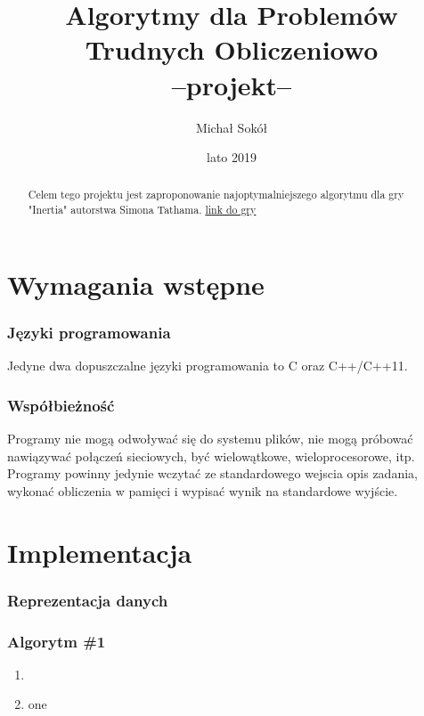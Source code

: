 \documentclass[12pt, letterpaper, twoside]{article}
\title{
	Algorytmy dla Problemów Trudnych Obliczeniowo \\
	\large --projekt--}
\author{Michał Sokół}
\date{lato 2019}
\begin{document}
\begin{titlepage}
\maketitle
\end{titlepage}


\begin{abstract}
Celem tego projektu jest zaproponowanie najoptymalniejszego algorytmu dla gry "Inertia" autorstwa Simona Tathama. \href{https://www.chiark.greenend.org.uk/~sgtatham/puzzles/js/inertia.html}{link do gry}
\end{abstract}
 
\part{Wymagania wstępne}
\section{Języki programowania}
Jedyne dwa dopuszczalne języki programowania to C oraz C++/C++11.
\section{Współbieżność}
Programy nie mogą odwoływać się do systemu plików, nie mogą próbować nawiązywać połączeń sieciowych, być wielowątkowe, wieloprocesorowe, itp. Programy powinny jedynie wczytać ze standardowego wejscia opis zadania, wykonać obliczenia w pamięci i wypisać wynik na standardowe wyjście.
\newpage

\part{Implementacja}
\section{Reprezentacja danych}

\section{Algorytm \#1}
\begin{enumerate}
	\item{}
	\item{one}
\end{enumerate}
\end{document}
